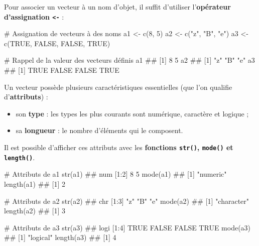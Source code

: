 \documentclass[12pt,twosided, notitlepage]{book}
\newenvironment{Shaded}{}{}
\newcommand{\CommentTok}[1]{\textcolor[rgb]{0.00,0.50,0.00}{#1}}
\newcommand{\DecValTok}[1]{#1}
\newcommand{\KeywordTok}[1]{\textcolor[rgb]{0.00,0.00,1.00}{#1}}
\newcommand{\NormalTok}[1]{#1}
\newcommand{\OtherTok}[1]{\textcolor[rgb]{1.00,0.25,0.00}{#1}}
\newcommand{\StringTok}[1]{\textcolor[rgb]{0.00,0.50,0.50}{#1}}
\providecommand{\tightlist}{%
  \setlength{\itemsep}{0pt}\setlength{\parskip}{0pt}}
\renewenvironment{Shaded}{\begin{snugshade}}{\end{snugshade}}
\begin{document}
Pour associer un vecteur à un nom d'objet, il suffit d'utiliser
l'\textbf{opérateur d'assignation
\texttt{\textless{}-}}\index{\texttt{<-}} :

\begin{Shaded}
\begin{Highlighting}[]
\CommentTok{# Assignation de vecteurs à des noms}
\NormalTok{a1 <-}\StringTok{ }\KeywordTok{c}\NormalTok{(}\DecValTok{8}\NormalTok{, }\DecValTok{5}\NormalTok{)}
\NormalTok{a2 <-}\StringTok{ }\KeywordTok{c}\NormalTok{(}\StringTok{"z"}\NormalTok{, }\StringTok{"B"}\NormalTok{, }\StringTok{"e"}\NormalTok{)}
\NormalTok{a3 <-}\StringTok{ }\KeywordTok{c}\NormalTok{(}\OtherTok{TRUE}\NormalTok{, }\OtherTok{FALSE}\NormalTok{, }\OtherTok{FALSE}\NormalTok{, }\OtherTok{TRUE}\NormalTok{)}

\CommentTok{# Rappel de la valeur des vecteurs définis}
\NormalTok{a1}
\NormalTok{  ## [1] 8 5}
\NormalTok{a2}
\NormalTok{  ## [1] "z" "B" "e"}
\NormalTok{a3}
\NormalTok{  ## [1]  TRUE FALSE FALSE  TRUE}
\end{Highlighting}
\end{Shaded}

Un vecteur possède plusieurs caractéristiques essentielles (que l'on
qualifie d'\textbf{attributs}) :

\begin{itemize}
\tightlist
\item
  son \textbf{type} : les types les plus courants sont numérique,
  caractère et logique ;
\item
  sa \textbf{longueur} : le nombre d'éléments qui le composent.
\end{itemize}

Il est possible d'afficher ces attributs avec les \textbf{fonctions
\texttt{str()}, \texttt{mode()} et
\texttt{length()}}.

\begin{Shaded}
\begin{Highlighting}[]
\CommentTok{# Attributs de a1}
\KeywordTok{str}\NormalTok{(a1)}
\NormalTok{  ##  num [1:2] 8 5}
\KeywordTok{mode}\NormalTok{(a1)}
\NormalTok{  ## [1] "numeric"}
\KeywordTok{length}\NormalTok{(a1)}
\NormalTok{  ## [1] 2}

\CommentTok{# Attributs de a2}
\KeywordTok{str}\NormalTok{(a2)}
\NormalTok{  ##  chr [1:3] "z" "B" "e"}
\KeywordTok{mode}\NormalTok{(a2)}
\NormalTok{  ## [1] "character"}
\KeywordTok{length}\NormalTok{(a2)}
\NormalTok{  ## [1] 3}

\CommentTok{# Attributs de a3}
\KeywordTok{str}\NormalTok{(a3)}
\NormalTok{  ##  logi [1:4] TRUE FALSE FALSE TRUE}
\KeywordTok{mode}\NormalTok{(a3)}
\NormalTok{  ## [1] "logical"}
\KeywordTok{length}\NormalTok{(a3)}
\NormalTok{  ## [1] 4}
\end{Highlighting}
\end{Shaded}
\end{document}
